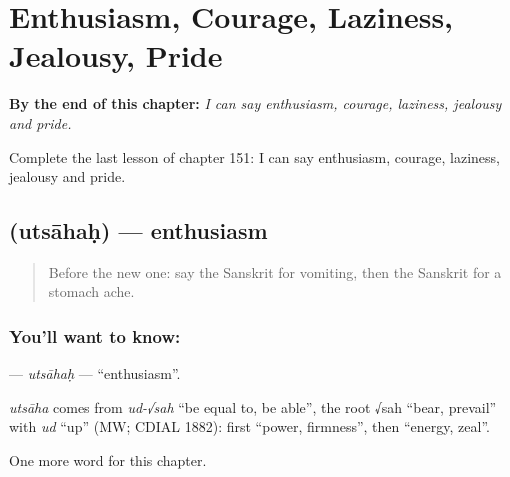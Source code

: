 
\chapter{Enthusiasm, Courage, Laziness, Jealousy, Pride}
\label{ch:sa-enthusiasm-courage-laziness-jealousy-pride}

\begin{chapteropening}
\textbf{By the end of this chapter:} \emph{I can say enthusiasm, courage, laziness, jealousy and pride.}

Complete the last lesson of chapter 151: I can say enthusiasm, courage, laziness, jealousy and pride.
\end{chapteropening}

\section[\texorpdfstring{\sk{उत्साहः} (utsāhaḥ)}{उत्साहः (utsāhaḥ)}]{ (utsāhaḥ) — enthusiasm}

\label{lesson:SA-C151-utsahah}



\begin{quote}
Before the new one: say the Sanskrit for vomiting, then the Sanskrit for a stomach ache.
\end{quote}

\subsection*{You'll want to know: }
\textbf{} — \emph{utsāhaḥ} — \textquotedblleft{}enthusiasm\textquotedblright{}.

\begin{cousinweb}
\emph{utsāha} comes from \emph{ud-√sah} \textquotedblleft{}be equal to, be able\textquotedblright{}, the root √sah \textquotedblleft{}bear, prevail\textquotedblright{} with \emph{ud} \textquotedblleft{}up\textquotedblright{} (MW; CDIAL 1882): first \textquotedblleft{}power, firmness\textquotedblright{}, then \textquotedblleft{}energy, zeal\textquotedblright{}.
\end{cousinweb}

\begin{grammarlens}[title={What you've built}]
One more word for this chapter.
\end{grammarlens}

